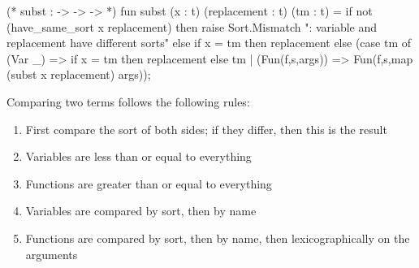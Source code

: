 \nwenddocs{}\endmoddef\nwstartdeflinemarkup{}\nwenddeflinemarkup
(* subst :  ->  ->  ->  *)
fun subst (x : t) (replacement : t) (tm : t) =
  if not (have_same_sort x replacement)
  then raise Sort.Mismatch ": variable and replacement have different sorts"
  else if x = tm then replacement
  else (case tm of
         (Var _) => if x = tm then replacement else tm
       | (Fun(f,s,args)) => Fun(f,s,map (subst x replacement) args));
\eatline
{}\nwendcode{}\nwdocspar
\begin{node}
Comparing two terms follows the following rules:
\begin{enumerate}
\item First compare the sort of both sides; if they differ, then this
  is the result
\item Variables are less than or equal to everything
\item Functions are greater than or equal to everything
\item Variables are compared by sort, then by name
\item Functions are compared by sort, then by name, then
  lexicographically on the arguments
\end{enumerate}
\end{node}


